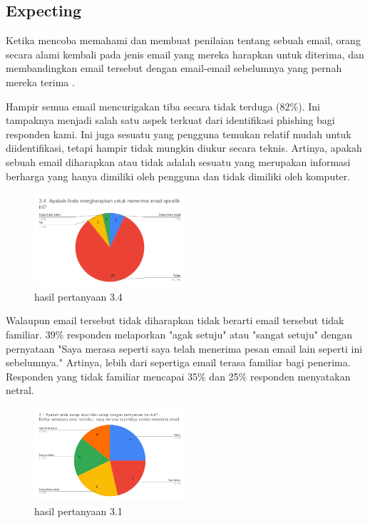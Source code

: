 \documentclass[lettersize,journal]{IEEEtran}
\begin{document}
\subsection{Expecting}

Ketika mencoba memahami dan membuat penilaian tentang sebuah email, orang
secara alami kembali pada jenis email yang mereka harapkan untuk diterima, dan
membandingkan email tersebut dengan email-email sebelumnya yang pernah mereka
terima \cite{tigaempat}.

Hampir semua email mencurigakan tiba secara tidak terduga (82\%). Ini tampaknya
menjadi salah satu aspek terkuat dari identifikasi phishing bagi responden
kami. Ini juga sesuatu yang pengguna temukan relatif mudah untuk
diidentifikasi, tetapi hampir tidak mungkin diukur secara teknis. Artinya,
apakah sebuah email diharapkan atau tidak adalah sesuatu yang merupakan
informasi berharga yang hanya dimiliki oleh pengguna dan tidak dimiliki oleh
komputer.

\begin{figure}[h!]
  \centering
  \includegraphics[width=0.5\textwidth]{image/3.4.png}
  \caption{hasil pertanyaan 3.4}
  \label{fig:pertanyaan_3.4}
\end{figure}

Walaupun email tersebut tidak diharapkan tidak berarti email
tersebut tidak familiar. 39\% responden melaporkan "agak setuju" atau "sangat
setuju" dengan pernyataan "Saya merasa seperti saya telah menerima pesan email
lain seperti ini sebelumnya." Artinya, lebih dari sepertiga email terasa
familiar bagi penerima. Responden yang tidak familiar mencapai 35\% dan 25\% 
responden menyatakan netral.

\begin{figure}[h!]
  \centering
  \includegraphics[width=0.5\textwidth]{image/3.1.png}
  \caption{hasil pertanyaan 3.1}
  \label{fig:pertanyaan_3.1}
\end{figure}
\end{document}
